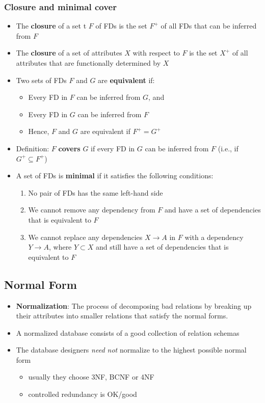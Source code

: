 \subsubsection{Closure and minimal cover}
\begin{itemize}
    \item The \textbf{closure} of a set t $F$ of FDs is the set $F^{+}$ of all FDs that can be inferred from $F$
    \item The \textbf{closure} of a set of attributes $X$ with respect to $F$ is the set $X^+$ of all attributes that are functionally determined by $X$
    \item Two sets of FDs $F$ and $G$ are \textbf{equivalent} if:
    \begin{itemize}
        \item Every FD in $F$ can be inferred from $G$, and
        \item Every FD in $G$ can be inferred from $F$
        \item Hence, $F$ and $G$ are equivalent if $F^+ = G^+$
    \end{itemize}
    \item Definition: $F$ \textbf{covers} $G$ if every FD in $G$ can be inferred from $F$ (i.e., if $G^+ \subseteq F^+$)
    \item A set of FDs is \textbf{minimal} if it satisfies the following conditions:
    \begin{enumerate}
        \item No pair of FDs has the same left-hand side 
        \item We cannot remove any dependency from $F$ and have a set of dependencies that is equivalent to $F$ 
        \item We cannot replace any dependencies $X\rightarrow A$ in $F$ with a dependency $Y\rightarrow A$, where $Y\subset X$ and still have a set of dependencies that is equivalent to $F$
    \end{enumerate}
\end{itemize}

\subsection{Normal Form}
\begin{itemize}
    \item \textbf{Normalization}: The process of decomposing bad relations by breaking up their attributes into smaller relations that satisfy the normal forms. 
    \item A normalized database consists of a good collection of relation schemas
    \item The database designers \textit{need not} normalize to the highest possible normal form
    \begin{itemize}
        \item usually they choose 3NF, BCNF or 4NF 
        \item controlled redundancy is OK/good
    \end{itemize}
\end{itemize}

